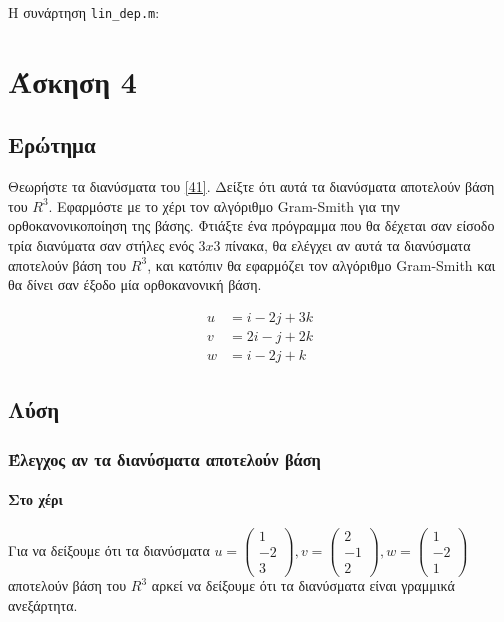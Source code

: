 \documentclass[12pt, fleqn, leqno]{extreport}
\begin{document}
Η συνάρτηση \lstinline[language={}]{lin_dep.m}:


\chapter{Άσκηση 4}
\section{Ερώτημα}

Θεωρήστε τα διανύσματα του \eqref{41}. Δείξτε ότι αυτά τα διανύσματα αποτελούν βάση του $R^{3}$. Εφαρμόστε με το χέρι τον αλγόριθμο Gram-Smith για την ορθοκανονικοποίηση της βάσης. Φτιάξτε ένα πρόγραμμα που θα δέχεται σαν είσοδο τρία διανύματα σαν στήλες ενός $3x3$ πίνακα, θα ελέγχει αν αυτά τα διανύσματα αποτελούν βάση του $R^{3}$, και κατόπιν θα εφαρμόζει τον αλγόριθμο Gram-Smith και θα δίνει σαν έξοδο μία ορθοκανονική βάση.

\begin{equation}
    \begin{aligned}
        u & = i - 2j + 3k \\
        v & = 2i - j + 2k \\
        w & = i - 2j + k
    \end{aligned}\label{41}
\end{equation}

\newpage
\section{Λύση}
\subsection{Έλεγχος αν τα διανύσματα αποτελούν βάση}
\subsubsection{Στο χέρι}

Για να δείξουμε ότι τα διανύσματα
$
    u = \begin{pmatrix}
        1 \\ -2 \\ 3
    \end{pmatrix},
    v = \begin{pmatrix}
        2 \\ -1 \\ 2
    \end{pmatrix},
    w = \begin{pmatrix}
        1 \\ -2 \\ 1
    \end{pmatrix}
$
αποτελούν βάση του $R^{3}$ αρκεί να δείξουμε ότι τα διανύσματα είναι γραμμικά ανεξάρτητα.
\end{document}
